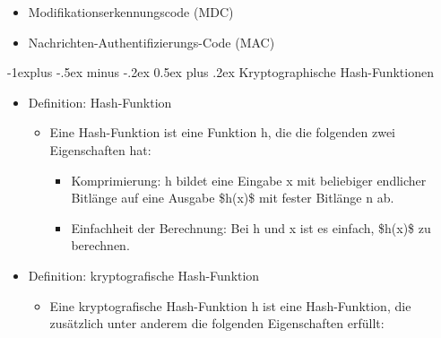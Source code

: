 \documentclass[a4paper]{article}
\makeatletter
\renewcommand{\subsection}{\@startsection{subsection}{2}{0mm}%
 {-1explus -.5ex minus -.2ex}%
 {0.5ex plus .2ex}%
 {\normalfont\normalsize\bfseries}}
\makeatother
\begin{document}
\begin{multicols}{3}
\begin{itemize}
\begin{itemize}
                        \begin{itemize}
                            \item
                                  Modifikationserkennungscode (MDC)
                            \item
                                  Nachrichten-Authentifizierungs-Code (MAC)
                        \end{itemize}
              \end{itemize}
    \end{itemize}


    \subsection{Kryptographische
        Hash-Funktionen}

    \begin{itemize}
        \item
              Definition: Hash-Funktion

              \begin{itemize}
                  \item
                        Eine Hash-Funktion ist eine Funktion h, die die folgenden zwei
                        Eigenschaften hat:

                        \begin{itemize}
                            \item
                                  Komprimierung: h bildet eine Eingabe x mit beliebiger endlicher
                                  Bitlänge auf eine Ausgabe \$h(x)\$ mit fester Bitlänge n ab.
                            \item
                                  Einfachheit der Berechnung: Bei h und x ist es einfach, \$h(x)\$
                                  zu berechnen.
                        \end{itemize}
              \end{itemize}
        \item
              Definition: kryptografische Hash-Funktion

              \begin{itemize}
                  \item
                        Eine kryptografische Hash-Funktion h ist eine Hash-Funktion, die
                        zusätzlich unter anderem die folgenden Eigenschaften erfüllt:


\end{itemize}
\end{itemize}
\end{multicols}
\end{document}
